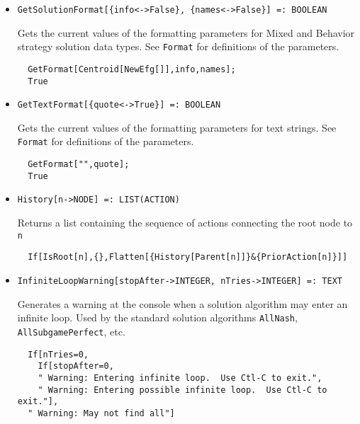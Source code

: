 \begin{itemize}
\item{}
\protect \large \begin{verbatim}
GetSolutionFormat[{info<->False}, {names<->False}] =: BOOLEAN 
\end{verbatim} \normalsize

\bd
Gets the current values of the formatting parameters for Mixed and
Behavior strategy solution data types.  See \verb+Format+ for
definitions of the parameters.  
\begin{verbatim}
  GetFormat[Centroid[NewEfg[]],info,names];
  True
\end{verbatim} 
\ed

\item{}
\protect \large \begin{verbatim}
GetTextFormat[{quote<->True}] =: BOOLEAN 
\end{verbatim} \normalsize

\bd
Gets the current values of the formatting parameters for text strings.  See
\verb+Format+ for definitions of the parameters. 
\begin{verbatim}
  GetFormat["",quote];
  True
\end{verbatim} 
\ed


\item{}
\protect \large \begin{verbatim}
History[n->NODE] =: LIST(ACTION) 
\end{verbatim}\normalsize

\bd 
Returns a list containing the sequence of actions connecting the root
node to \verb+n+
\begin{verbatim}
  If[IsRoot[n],{},Flatten[{History[Parent[n]]}&{PriorAction[n]}]]
\end{verbatim} 
\ed


\item{}
\protect \large \begin{verbatim}
InfiniteLoopWarning[stopAfter->INTEGER, nTries->INTEGER] =: TEXT 
\end{verbatim}\normalsize

\bd 
Generates a warning at the console when a solution algorithm may enter
an infinite loop.  Used by the standard solution algorithms
\verb+AllNash+, \verb+AllSubgamePerfect+, etc.  

\begin{verbatim}
  If[nTries=0,
    If[stopAfter=0,
    " Warning: Entering infinite loop.  Use Ctl-C to exit.",  
    " Warning: Entering possible infinite loop.  Use Ctl-C to exit."],
  " Warning: May not find all"]
\end{verbatim} 
\ed


\end{itemize}
